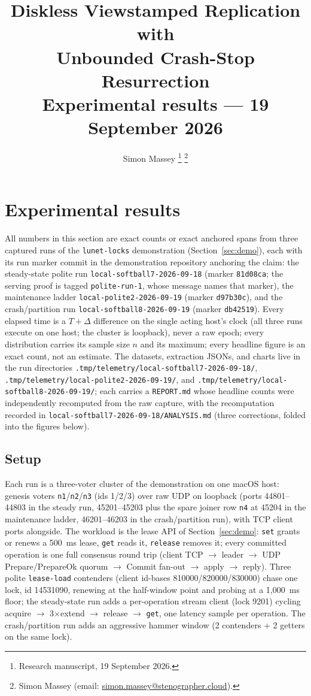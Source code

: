 \documentclass[10pt,journal,letterpaper]{IEEEtran}
\title{Diskless Viewstamped Replication with\\Unbounded Crash-Stop Resurrection\\
\large Experimental results --- 19 September 2026}
\author{Simon Massey%
\thanks{Research manuscript, 19 September 2026.}%
\thanks{Simon Massey (email: \href{mailto:simon.massey@stenographer.cloud}{simon.massey@stenographer.cloud}).}}
\date{}
\newcommand{\code}[1]{\texttt{\small #1}}
\begin{document}
\maketitle
\thispagestyle{uvrrfirst}

\section{Experimental results}\label{sec:results20260919}

All numbers in this section are exact counts or exact anchored spans from
three captured runs of the \code{lunet-locks} demonstration
(Section~\ref{sec:demo}), each with its run marker commit in the
demonstration repository anchoring the claim: the steady-state polite run
\code{local-softball7-2026-09-18} (marker \code{81d08ca}; the serving proof
is tagged \code{polite-run-1}, whose message names that marker), the
maintenance ladder \code{local-polite2-2026-09-19} (marker \code{d97b30c}),
and the crash/partition run \code{local-softball8-2026-09-19} (marker
\code{db42519}). Every elapsed time is a $T+\Delta$ difference on the
single acting host's clock (all three runs execute on one host; the cluster
is loopback), never a raw epoch; every distribution carries its sample size
$n$ and its maximum; every headline figure is an exact count, not an
estimate. The datasets, extraction JSONs, and charts live in the run
directories \code{.tmp/telemetry/local-softball7-2026-09-18/},
\code{.tmp/telemetry/local-polite2-2026-09-19/}, and
\code{.tmp/telemetry/local-softball8-2026-09-19/}; each carries a
\code{REPORT.md} whose headline counts were independently recomputed from
the raw capture, with the recomputation recorded in
\code{local-softball7-2026-09-18/ANALYSIS.md} (three corrections, folded
into the figures below).

\subsection{Setup}\label{sec:exp-setup}

Each run is a three-voter cluster of the demonstration on one macOS host:
genesis voters \code{n1}/\code{n2}/\code{n3} (ids 1/2/3) over raw UDP on
loopback (ports 44801--44803 in the steady run, 45201--45203 plus the spare
joiner row \code{n4} at 45204 in the maintenance ladder, 46201--46203 in the
crash/partition run), with TCP client ports alongside. The workload is the
lease API of Section~\ref{sec:demo}: \code{set} grants or renews a 500~ms
lease, \code{get} reads it, \code{release} removes it; every committed
operation is one full consensus round trip (client TCP $\to$ leader $\to$
UDP Prepare/PrepareOk quorum $\to$ Commit fan-out $\to$ apply $\to$ reply).
Three polite \code{lease-load} contenders (client id-bases 810000/820000/830000)
chase one lock, id 14531090, renewing at the half-window point and probing
at a 1{,}000~ms floor; the steady-state run adds a per-operation stream
client (lock 9201) cycling acquire $\to$ 3$\times$extend $\to$ release $\to$
\code{get}, one latency sample per operation. The crash/partition run adds
an aggressive hammer window (2 contenders + 2 getters on the same lock).
\end{document}
